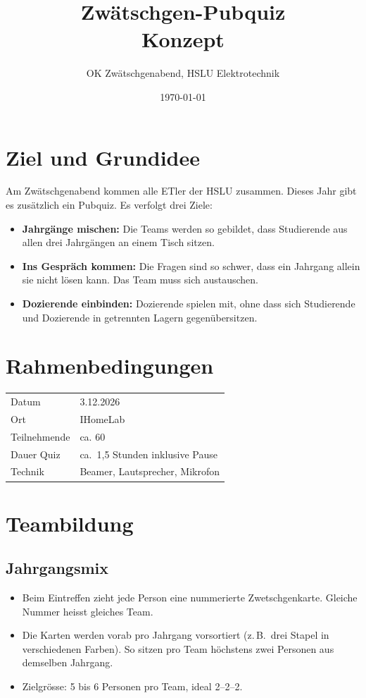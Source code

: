 \documentclass[a4paper,11pt]{article}
\title{\textcolor{zwetschge}{\textbf{Zwätschgen-Pubquiz}}\\[0.3em]\large Konzept}
\author{OK Zwätschgenabend, HSLU Elektrotechnik}
\date{\today}
\begin{document}
\maketitle
\thispagestyle{fancy}
\tableofcontents

\section{Ziel und Grundidee}
Am Zwätschgenabend kommen alle ETler der HSLU zusammen. Dieses Jahr gibt es zusätzlich ein Pubquiz. Es verfolgt drei Ziele:
\begin{itemize}
  \item \textbf{Jahrgänge mischen:} Die Teams werden so gebildet, dass Studierende aus allen drei Jahrgängen an einem Tisch sitzen.
  \item \textbf{Ins Gespräch kommen:} Die Fragen sind so schwer, dass ein Jahrgang allein sie nicht lösen kann. Das Team muss sich austauschen.
  \item \textbf{Dozierende einbinden:} Dozierende spielen mit, ohne dass sich Studierende und Dozierende in getrennten Lagern gegenübersitzen.
\end{itemize}

\section{Rahmenbedingungen}
\begin{tabularx}{\textwidth}{@{}l X@{}}
\toprule
Datum & 3.12.2026\\
Ort & IHomeLab \\
Teilnehmende & ca. 60 \\
Dauer Quiz & ca.\ 1,5 Stunden inklusive Pause \\
Technik & Beamer, Lautsprecher, Mikrofon \\
\bottomrule
\end{tabularx}

\section{Teambildung}
\subsection{Jahrgangsmix}
\begin{itemize}
  \item Beim Eintreffen zieht jede Person eine nummerierte Zwetschgenkarte. Gleiche Nummer heisst gleiches Team.
  \item Die Karten werden vorab pro Jahrgang vorsortiert (z.\,B.\ drei Stapel in verschiedenen Farben). So sitzen pro Team höchstens zwei Personen aus demselben Jahrgang.
  \item Zielgrösse: 5 bis 6 Personen pro Team, ideal 2--2--2.
\end{itemize}
\end{document}

